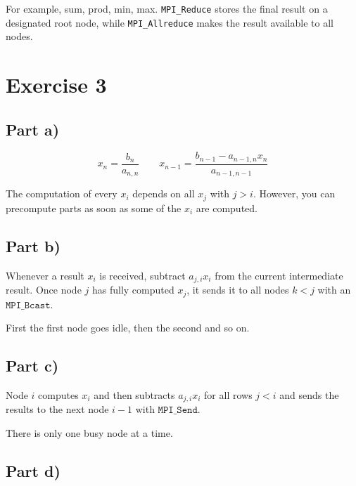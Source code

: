 \documentclass[10pt,a4paper]{article}
\begin{document}
For example, sum, prod, min, max.
\texttt{MPI_Reduce} stores the final result on a designated root node, while \texttt{MPI_Allreduce} makes the result available to all nodes.

\section*{Exercise 3}

\subsection*{Part a)}

\begin{equation*}
  x_{n} = \frac{b_{n}}{a_{n,n}} \qquad x_{n - 1} = \frac{b_{n - 1} - a_{n - 1,n}x_{n}}{a_{n - 1, n - 1}}
\end{equation*}

The computation of every $x_{i}$ depends on all $x_{j}$ with $j > i$.
However, you can precompute parts as soon as some of the $x_{i}$ are computed.

\subsection*{Part b)}

Whenever a result $x_{i}$ is received, subtract $a_{j,i}x_{i}$ from the current intermediate result.
Once node $j$ has fully computed $x_{j}$, it sends it to all nodes $k < j$ with an $\mathtt{MPI\_Bcast}$.

First the first node goes idle, then the second and so on.

\subsection*{Part c)}

Node $i$ computes $x_{i}$ and then subtracts $a_{j,i}x_{i}$ for all rows $j < i$ and sends the results to the next node $i - 1$ with $\mathtt{MPI\_Send}$.

There is only one busy node at a time.

\subsection*{Part d)}
\end{document}
